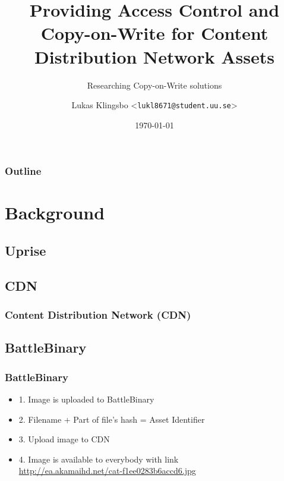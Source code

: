 \documentclass{beamer}
\title{Providing Access Control and Copy-on-Write for Content Distribution Network Assets}
\subtitle{Researching Copy-on-Write solutions}
\author[Lukas Klingsbo | \emph{lukl8671@student.uu.se}] %
{Lukas Klingsbo <\texttt{lukl8671@student.uu.se}>}
\institute[Dept.\ of Information Technology]%
{Department of Information Technology\\Uppsala University}
\date[]
{\today}
\begin{document}
\begin{frame}[plain] %
  \titlepage
\end{frame}

\begin{frame}
    \frametitle{Outline}
    \setcounter{tocdepth}{2}
    \tableofcontents[]
\end{frame}

\section{Background}

\subsection{Uprise}
\begin{frame}
  \frametitle{}
  \centerline{}
  \vspace{30pt}
  \centerline{}
  \vspace{10pt}
  \centerline{}
  \vspace{10pt}
  \centerline{}
\end{frame}

\subsection{CDN}
\begin{frame}
  \frametitle{Content Distribution Network (CDN)}
  \centerline{}
\end{frame}

\subsection{BattleBinary}
\begin{frame}
  \frametitle{BattleBinary}
  \centerline{}
  \begin{itemize}
    \item{1. Image is uploaded to BattleBinary}
    \pause
    \item{2. Filename + Part of file's hash = Asset Identifier}
    \pause
    \item{3. Upload image to CDN}
    \pause
    \item{4. Image is available to everybody with
            link\\ \url{http://ea.akamaihd.net/cat-f1ee0283b6accd6.jpg}}
  \end{itemize}
\end{frame}
\end{document}
